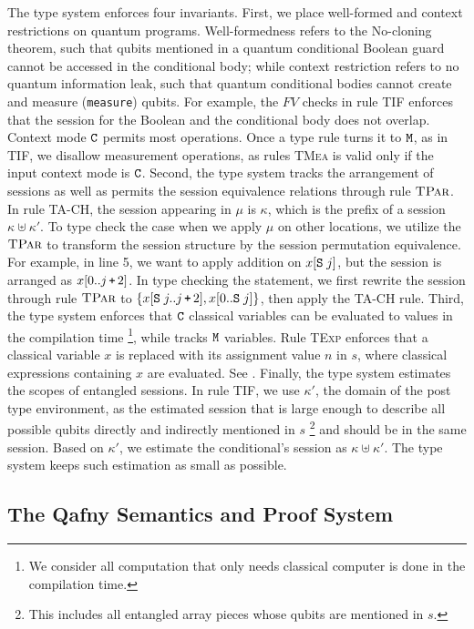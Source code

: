 The type system enforces four invariants.  First, we place well-formed and context restrictions on quantum programs.
Well-formedness refers to the No-cloning theorem, such that qubits mentioned in a quantum conditional Boolean guard cannot be accessed in the conditional body; while context restriction refers to no quantum information leak, such that quantum conditional bodies cannot create and measure (\texttt{measure}) qubits.
For example, the $FV$ checks in rule \textsc{TIF} enforces that the session for the Boolean and the conditional body does not overlap.
Context mode $\texttt{C}$ permits most \qafny operations. Once a type rule turns it to $\texttt{M}$, as in \textsc{TIF}, we disallow measurement operations, as rules \textsc{TMea} is valid only if the input context mode is $\texttt{C}$.
Second, the type system tracks the arrangement of sessions as well as permits the session equivalence relations through rule $\textsc{TPar}$. In rule \textsc{TA-CH}, the session appearing in $\mu$ is $\kappa$, which is the prefix of a session $\kappa \uplus \kappa'$. To type check the case when we apply $\mu$ on other locations, we utilize the $\textsc{TPar}$ to transform the session structure by the session permutation equivalence. For example, in  line 5, we want to apply addition on $x[\texttt{S}\;j]$, but the session is arranged as $x[0..j\,\texttt{+}\,2]$. In type checking the statement, we first rewrite the session through rule $\textsc{TPar}$ to $\{x[\texttt{S}\;j..j\,\texttt{+}\,2],x[0..\texttt{S}\;j]\}$, then apply the \textsc{TA-CH} rule.
Third, the type system enforces that $\texttt{C}$ classical variables can be evaluated to values in the compilation time \footnote{We consider all computation that only needs classical computer is done in the compilation time.}, while tracks $\texttt{M}$ variables. Rule \textsc{TExp} enforces that a classical variable $x$ is replaced with its assignment value $n$ in $s$, where classical expressions containing $x$ are evaluated. See .
Finally, the type system estimates the scopes of entangled sessions. In rule \textsc{TIF}, we use $\kappa'$, the domain of the post type environment, as the estimated session that is large enough to describe all possible qubits directly and indirectly mentioned in $s$ \footnote{This includes all entangled array pieces whose qubits are mentioned in $s$. } and should be in the same session. Based on $\kappa'$, we estimate the conditional's session as $\kappa \uplus \kappa'$.
The type system keeps such estimation as small as possible.

\subsection{The Qafny Semantics and Proof System}\label{sec:semantics-proof}

